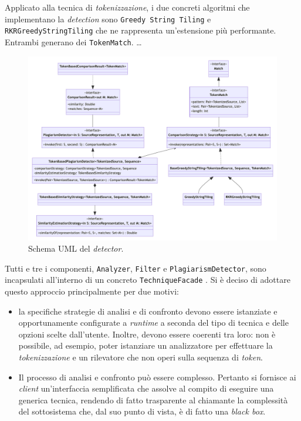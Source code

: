 Applicato alla tecnica di \textit{tokenizzazione}, i due concreti algoritmi che implementano la \textit{detection} sono \texttt{Greedy String Tiling} e \texttt{RKRGreedyStringTiling} che ne rappresenta un'estensione più performante.
%
Entrambi generano dei \texttt{TokenMatch}. \dots

\begin{figure}
    \centering
    \includegraphics[width=\textwidth]{resources/img/02-detector.pdf}
    \caption{Schema UML del \textit{detector}.}
    \label{img:02-detector}
\end{figure}

Tutti e tre i componenti, \texttt{Analyzer}, \texttt{Filter} e \texttt{PlagiarismDetector}, sono incapsulati all'interno di un concreto \texttt{TechniqueFacade} \cite{gof}.
%
Si è deciso di adottare questo approccio principalmente per due motivi:
\begin{itemize}
    \item la specifiche strategie di analisi e di confronto devono essere istanziate e opportunamente configurate a \textit{runtime} a seconda del tipo di tecnica e delle opzioni scelte dall'utente. Inoltre, devono essere coerenti tra loro: non è possibile, ad esempio, poter istanziare un analizzatore per effettuare la \textit{tokenizzazione} e un rilevatore che non operi sulla sequenza di \textit{token}.
    \item Il processo di analisi e confronto può essere complesso. Pertanto si fornisce ai \textit{client} un'interfaccia semplificata che assolve al compito di eseguire una generica tecnica, rendendo di fatto trasparente al chiamante la complessità del sottosistema che, dal suo punto di vista, è di fatto una \textit{black box}.
\end{itemize}

